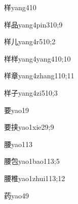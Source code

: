 \begin{verbete}{样}{yang4}{10}
\end{verbete}

\begin{verbete}{样品}{yang4pin3}{10;9}
\end{verbete}

\begin{verbete}{样儿}{yang4r5}{10;2}
\end{verbete}

\begin{verbete}{样样}{yang4yang4}{10;10}
\end{verbete}

\begin{verbete}{样章}{yang4zhang1}{10;11}
\end{verbete}

\begin{verbete}{样子}{yang4zi5}{10;3}
\end{verbete}

\begin{verbete}{要}{yao1}{9}
\end{verbete}

\begin{verbete}{要挟}{yao1xie2}{9;9}
\end{verbete}

\begin{verbete}{腰}{yao1}{13}
\end{verbete}

\begin{verbete}{腰包}{yao1bao1}{13;5}
\end{verbete}

\begin{verbete}{腰椎}{yao1zhui1}{13;12}
\end{verbete}

\begin{verbete}{药}{yao4}{9}
\end{verbete}

